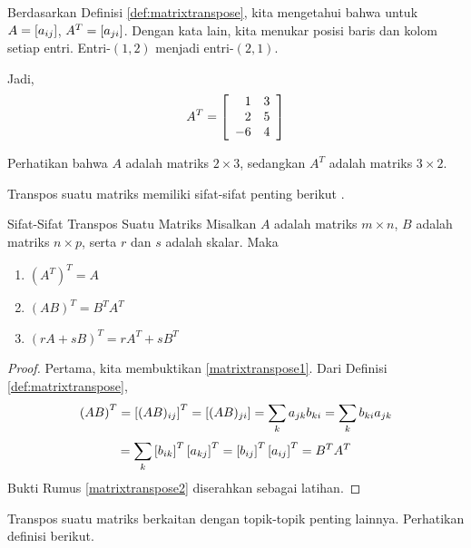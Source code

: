 \begin{solution}
Berdasarkan Definisi \ref{def:matrixtranspose}, kita mengetahui bahwa untuk $A = \left[ a_{ij} \right]$,
$A^T = \left[ a_{ji} \right]$. Dengan kata lain, kita menukar posisi baris dan kolom
setiap entri. Entri-$\left( 1, 2 \right)$ menjadi entri-$\left( 2,1 \right)$.

Jadi,
\begin{equation*}
A^T = 
 \left[
\begin{array}{rr}
1 & 3 \\
2 & 5 \\
-6 & 4
\end{array}
\right] 
\end{equation*}

Perhatikan bahwa $A$ adalah matriks $2 \times 3$, sedangkan $A^T$ adalah matriks $3 \times 2$.
\end{solution}

Transpos suatu matriks memiliki sifat-sifat penting berikut .

\begin{lemma}{Sifat-Sifat Transpos Suatu Matriks}\label{lem:transposeproperties}
Misalkan $A$ adalah matriks $m\times n$, $B$ adalah matriks $n\times p$, serta $r$ dan $s$ adalah skalar. Maka
\begin{enumerate}
\item
$\left(A^{T}\right)^{T} = A$
\item
$\left( AB\right) ^{T}=B^{T}A^{T} $ \label{matrixtranspose1}
\item
$\left( rA+ sB\right) ^{T}=rA^{T}+ sB^{T}$  \label{matrixtranspose2}
\end{enumerate}
\end{lemma}

\ifdefined\showproofs
\begin{proof}
Pertama, kita membuktikan \ref{matrixtranspose1}. Dari Definisi \ref{def:matrixtranspose},
\begin{equation*}
\left(AB\right)^{T} = \left[ (AB) _{ij} \right] ^{T}=\left[ (AB)_{ji} \right]=\sum_{k}a_{jk}b_{ki}= \sum_{k}b_{ki}a_{jk} 
\end{equation*}
\begin{equation*}
= \sum_{k}\left[ b_{ik}\right]^{T}\left[
a_{kj}\right]^{T}=\left[ b_{ij}\right] ^{T} \left[ a_{ij}\right]^{T} = B^{T}A^{T} 
\end{equation*}
Bukti Rumus \ref{matrixtranspose2} diserahkan sebagai latihan. 
\end{proof}
\fi
Transpos suatu matriks berkaitan dengan topik-topik penting lainnya. Perhatikan definisi berikut.  

